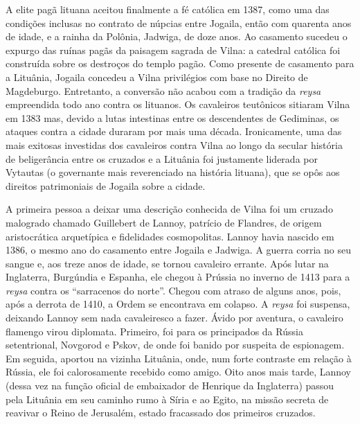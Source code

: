 A elite pagã lituana aceitou finalmente a fé católica em 1387, como uma
das condições inclusas no contrato de núpcias entre Jogaila, então com
quarenta anos de idade, e a rainha da Polônia, Jadwiga, de doze anos. Ao
casamento sucedeu o expurgo das ruínas pagãs da paisagem sagrada de
Vilna: a catedral católica foi construída sobre os destroços do templo
pagão. Como presente de casamento para a Lituânia, Jogaila concedeu a
Vilna privilégios com base no Direito de Magdeburgo. Entretanto, a
conversão não acabou com a tradição da \textit{reysa} empreendida todo ano
contra os lituanos. Os cavaleiros teutônicos sitiaram Vilna em 1383 mas,
devido a lutas intestinas entre os descendentes de Gediminas, os ataques
contra a cidade duraram por mais uma década. Ironicamente, uma das mais
exitosas investidas dos cavaleiros contra Vilna ao longo da secular
história de beligerância entre os cruzados e a Lituânia foi justamente
liderada por Vytautas (o governante mais reverenciado na história
lituana), que se opôs aos direitos patrimoniais de Jogaila sobre a
cidade.

A primeira pessoa a deixar uma descrição conhecida de Vilna foi um
cruzado malogrado chamado Guillebert de Lannoy, patrício de Flandres, de
origem aristocrática arquetípica e fidelidades cosmopolitas. Lannoy
havia nascido em 1386, o mesmo ano do casamento entre Jogaila e Jadwiga.
A guerra corria no seu sangue e, aos treze anos de idade, se tornou
cavaleiro errante. Após lutar na Inglaterra, Burgúndia e Espanha, ele
chegou à Prússia no inverno de 1413 para a \textit{reysa} contra os
``sarracenos do norte''. Chegou com atraso de alguns anos, pois, após a
derrota de 1410, a Ordem se encontrava em colapso. A \textit{reysa} foi
suspensa, deixando Lannoy sem nada cavaleiresco a fazer. Ávido por
aventura, o cavaleiro flamengo virou diplomata. Primeiro, foi para os
principados da Rússia setentrional, Novgorod e Pskov, de onde foi banido
por suspeita de espionagem. Em seguida, aportou na vizinha Lituânia,
onde, num forte contraste em relação à Rússia, ele foi calorosamente
recebido como amigo. Oito anos mais tarde, Lannoy (dessa vez na função
oficial de embaixador de Henrique  da Inglaterra) passou pela Lituânia
em seu caminho rumo à Síria e ao Egito, na missão secreta de reavivar o
Reino de Jerusalém, estado fracassado dos primeiros cruzados.

